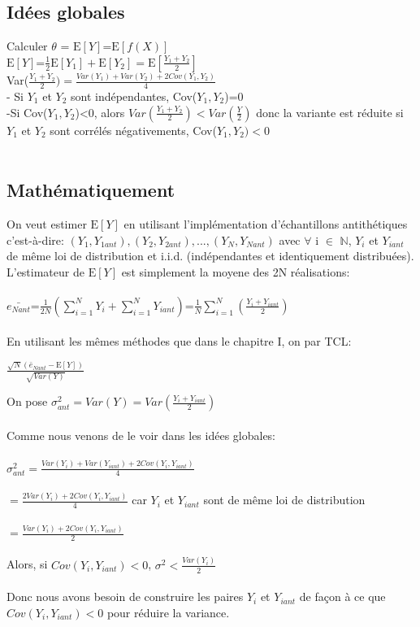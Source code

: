 \documentclass[12pt]{report}
\begin{document}
\subsection{Idées globales}
Calculer $\theta$ = $\text{E}[Y]$=$\text{E}[f(X)]$\\
$\text{E}[Y]$=$\frac{1}{2}$$\text{E}[Y_1]+\text{E}[Y_2]=\text{E}[\frac{Y_1+Y_2}{2}]$\\
Var($\frac{Y_1+Y_2}{2})=\frac{Var(Y_1)+Var(Y_2)+2Cov(Y_1,Y_2)}{4}$\\
- Si $Y_1$ et $Y_2$ sont indépendantes, Cov($Y_1,Y_2$)=0\\
-Si Cov($Y_1,Y_2$)<0, alors $Var(\frac{Y_1+Y_2}{2})<Var(\frac{Y}{2})$ donc la variante est réduite si $Y_1$ et $Y_2$ sont corrélés négativements, Cov($Y_1,Y_2)<$0\\\\
\subsection{Mathématiquement}
On veut estimer $\text{E}[Y]$ en utilisant l'implémentation d'échantillons antithétiques c'est-à-dire: $(Y_1,Y_{1ant}),(Y_2,Y_{2ant}),...,(Y_N,Y_{Nant})$  avec $\forall$ i $\in$ $\mathbb{N}$, $Y_i$ et $Y_{iant}$ de même loi de distribution et i.i.d. (indépendantes et identiquement distribuées).\\
L'estimateur de $\text{E}[Y]$ est simplement la moyene des 2N réalisations:\\\\
$\bar{e_{Nant}}$=$\frac{1}{2N}(\sum_{i=1}^{N}Y_i +\sum_{i=1}^{N}Y_{iant})$=$\frac{1}{N}\sum_{i=1}^{N}(\frac{Y_i+Y_{iant}}{2})$\\\\
En utilisant les mêmes méthodes que dans le chapitre I, on par TCL:\\
\begin{center}
	$\frac{\sqrt{N}(\bar{e}_{Nant}-\text{E}[Y])}{\sqrt{Var(Y)}}$
\end{center}
On pose $\sigma^2_{ant}=Var(Y)=Var(\frac{Y_i+Y_{iant}}{2})$\\\\
Comme nous venons de le voir dans les idées globales:\\\\
$\sigma^2_{ant}=\frac{Var(Y_i)+Var(Y_{iant})+2Cov(Y_i,Y_{iant})}{4}$\\\\
$ =\frac{2Var(Y_i)+2Cov(Y_i,Y_{iant})}{4}$ car $Y_i $ et $ Y_{iant}$ sont de même loi de distribution\\\\
$=\frac{Var(Y_i)+2Cov(Y_i,Y_{iant})}{2}$\\\\
Alors, si $Cov(Y_i,Y_{iant}) <0$, $\sigma^2<\frac{Var(Y_i)}{2}$\\\\
Donc nous avons besoin de construire les paires $Y_i$ et $Y_{iant}$ de façon à ce que $Cov(Y_i,Y_{iant}) <0$ pour réduire la variance.\\\\
\end{document}
